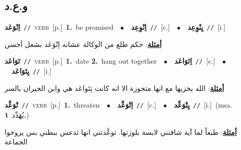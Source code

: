 \documentclass[10pt,a4paper,twoside]{article} %
\begin{document}
\begin{multicols}{2}
\vspace{-3mm}
\subsection*{\color{blue}\foreignlanguage{arabic}{و.ع.د}\color{blue}{}} 

{\setlength\topsep{0pt}\textbf{\foreignlanguage{arabic}{اِنْوَعَد}}\ {\color{gray}\texttt{//}\color{black}}\ \textsc{verb}\ [p.]\ \textbf{1.}~be promised\ \ $\bullet$\ \ \setlength\topsep{0pt}\textbf{\foreignlanguage{arabic}{اِنْوِعِد}}\ {\color{gray}\texttt{//}\color{black}}\ [c.]\ \ $\bullet$\ \ \setlength\topsep{0pt}\textbf{\foreignlanguage{arabic}{يِنْوِعِد}}\ {\color{gray}\texttt{//}\color{black}}\ [i.]\  \begin{flushright}\color{gray}\foreignlanguage{arabic}{\textbf{\underline{\foreignlanguage{arabic}{أمثلة}}}: حكم طلع من الوكالة عشانه اِنْوَعَد بشغل أحسن}\end{flushright}\color{black}} \vspace{2mm}

{\setlength\topsep{0pt}\textbf{\foreignlanguage{arabic}{تَوَاعَد}}\ {\color{gray}\texttt{//}\color{black}}\ \textsc{verb}\ [p.]\ \textbf{1.}~date  \textbf{2.}~hang out together\ \ $\bullet$\ \ \setlength\topsep{0pt}\textbf{\foreignlanguage{arabic}{اِتَوَاعَد}}\ {\color{gray}\texttt{//}\color{black}}\ [c.]\ \ $\bullet$\ \ \setlength\topsep{0pt}\textbf{\foreignlanguage{arabic}{يِتَوَاعَد}}\ {\color{gray}\texttt{//}\color{black}}\ [i.]\  \begin{flushright}\color{gray}\foreignlanguage{arabic}{\textbf{\underline{\foreignlanguage{arabic}{أمثلة}}}: الله يخزيها مع انها متجوزة الا انه كانت تِتَواعَد هي وابن الجيران بالسر}\end{flushright}\color{black}} \vspace{2mm}

{\setlength\topsep{0pt}\textbf{\foreignlanguage{arabic}{تْوَعَّد}}\ {\color{gray}\texttt{//}\color{black}}\ \textsc{verb}\ [p.]\ \textbf{1.}~threaten\ \ $\bullet$\ \ \setlength\topsep{0pt}\textbf{\foreignlanguage{arabic}{اِتْوَعَّد}}\ {\color{gray}\texttt{//}\color{black}}\ [c.]\ \ $\bullet$\ \ \setlength\topsep{0pt}\textbf{\foreignlanguage{arabic}{يِتْوَعَّد}}\ {\color{gray}\texttt{//}\color{black}}\ [i.]\ \color{gray}(msa. \foreignlanguage{arabic}{يُهَدِّد}~\foreignlanguage{arabic}{\textbf{١.}})\color{black}\  \begin{flushright}\color{gray}\foreignlanguage{arabic}{\textbf{\underline{\foreignlanguage{arabic}{أمثلة}}}: طبعاً لما آية شافتني لابسة بلوزتها. توعَّدتني انها تدعس ببطني بس يروحوا الجماعة}\end{flushright}\color{black}} \vspace{2mm}


\end{multicols}
\end{document}
